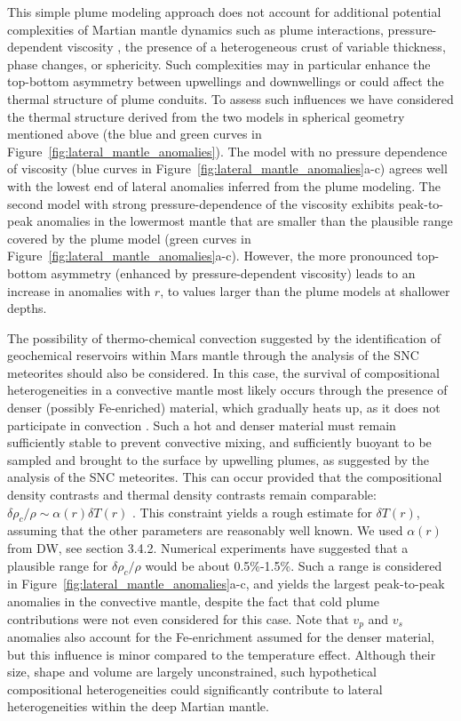 This simple plume modeling approach does not account for additional potential complexities of Martian mantle dynamics such as plume interactions, pressure-dependent viscosity \citep{Leng&zhong2008}, the presence of a heterogeneous crust of variable thickness, phase changes, or sphericity. Such complexities may in particular enhance the top-bottom asymmetry between upwellings and downwellings or could affect the thermal structure of plume conduits. To assess such influences we have considered the thermal structure derived from the two models in spherical geometry mentioned above (the blue and green curves in Figure~\ref{fig:lateral_mantle_anomalies}). The model with no pressure dependence of viscosity (blue curves in Figure~\ref{fig:lateral_mantle_anomalies}a-c) agrees well with the lowest end of lateral anomalies inferred from the plume modeling. The second model with strong pressure-dependence of the viscosity exhibits peak-to-peak anomalies in the lowermost mantle that are smaller than the plausible range covered by the plume model (green curves in Figure~\ref{fig:lateral_mantle_anomalies}a-c). However, the more pronounced top-bottom asymmetry (enhanced by pressure-dependent viscosity) leads to an increase in anomalies with $r$, to values larger than the plume models at shallower depths. 

The possibility of thermo-chemical convection suggested by the identification of geochemical reservoirs within Mars mantle through the analysis of the SNC meteorites \citep{Debaille2007} should also be considered. In this case, the survival of compositional heterogeneities in a convective mantle most likely occurs through the presence of denser (possibly Fe-enriched) material, which gradually heats up, as it does not participate in convection \citep{Samuel2003}. Such a hot and denser material must remain sufficiently stable to prevent convective mixing, and sufficiently buoyant to be sampled and brought to the surface by upwelling plumes, as suggested by the analysis of the SNC meteorites. This can occur provided that the compositional density contrasts and thermal density contrasts remain comparable: $\delta \rho_c/\rho \sim \alpha(r)\delta T(r)$ \citep{LeBars2004}. This constraint yields a rough estimate for $\delta T(r)$, assuming that the other parameters are reasonably well known. We used $\alpha(r)$ from DW, see section 3.4.2. Numerical experiments \citep{Tosi2013} have suggested that a plausible range for  $\delta \rho_c/\rho$ would be about 0.5\%-1.5\%. Such a range is considered in Figure~\ref{fig:lateral_mantle_anomalies}a-c, and yields the largest peak-to-peak anomalies in the convective mantle, despite the fact that cold plume contributions were not even considered for this case. Note that $v_p$ and $v_s$ anomalies also account for the Fe-enrichment assumed for the denser material, but this influence is minor compared to the temperature effect. Although their size, shape and volume are largely unconstrained, such hypothetical compositional heterogeneities could significantly contribute to lateral heterogeneities within the deep Martian mantle.


